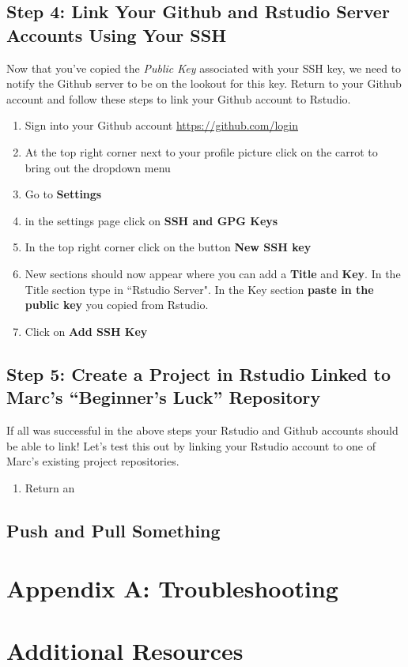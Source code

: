 \documentclass{article}\usepackage[]{graphicx}\usepackage[]{color}
\begin{document}
  \subsection*{Step 4: Link Your Github and Rstudio Server Accounts Using Your SSH} 
  Now that you've copied the \emph{Public Key} associated with your SSH key, we need to notify the Github server to be on the lookout for this key. Return to your Github account and follow these steps to link your Github account to Rstudio. 
  \begin{enumerate}
  \item Sign into your Github account \url{https://github.com/login}
  \item At the top right corner next to your profile picture click on the carrot to bring out the dropdown menu
  \item Go to \textbf{Settings}
  \item in the settings page click on \textbf{SSH and GPG Keys}
  \item In the top right corner click on the button \textbf{New SSH key}
  \item New sections should now appear where you can add a \textbf{Title} and \textbf{Key}. In the Title section type in ``Rstudio Server". In the Key section \textbf{paste in the public key} you copied from Rstudio.
  \item Click on \textbf{Add SSH Key}
  \end{enumerate}
 
  \subsection*{Step 5: Create a Project in Rstudio Linked to Marc's ``Beginner's Luck'' Repository}
If all was successful in the above steps your Rstudio and Github accounts should be able to link! Let's test this out by linking your Rstudio account to one of Marc's existing project repositories. 
  \begin{enumerate}
  \item Return an 
  \end{enumerate} 
  \subsection*{Push and Pull Something}
  
\section{Appendix A: Troubleshooting}
\section{Additional Resources}
\end{document}
